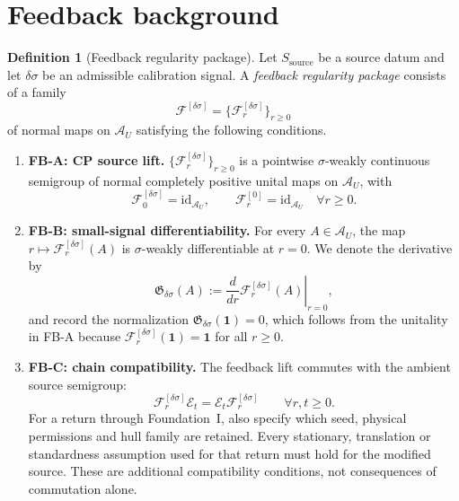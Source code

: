 \documentclass[12pt]{article}
\theoremstyle{definition}
\newtheorem{definition}[theorem]{Definition}
\theoremstyle{remark}
\begin{document}
\section{Feedback background}\label{app:feedback_background}
\begin{definition}[Feedback regularity package]\label{def:FB}
Let \(S_{\mathrm{source}}\) be a source datum and let
\(\delta\sigma\) be an admissible calibration signal. A
\emph{feedback regularity package} consists of a family
\[
\mathscr F^{[\delta\sigma]}
=
\{\mathscr F_r^{[\delta\sigma]}\}_{r\ge0}
\]
of normal maps on \(\mathcal A_U\) satisfying the following conditions.
\begin{enumerate}
\item \textbf{FB-A: CP source lift.}
  \(\{\mathscr F_r^{[\delta\sigma]}\}_{r\ge0}\) is a pointwise
  \(\sigma\)-weakly continuous semigroup of normal completely positive
  unital maps on \(\mathcal A_U\), with
  \[
  \mathscr F_0^{[\delta\sigma]}=\mathrm{id}_{\mathcal A_U},
  \qquad
  \mathscr F_r^{[0]}=\mathrm{id}_{\mathcal A_U}
  \quad
  \forall r\ge0.
  \]
\item \textbf{FB-B: small-signal differentiability.}
  For every \(A\in\mathcal A_U\), the map
  \(r\mapsto \mathscr F_r^{[\delta\sigma]}(A)\) is
  \(\sigma\)-weakly differentiable at \(r=0\). We denote the
  derivative by
  \[
  \mathfrak G_{\delta\sigma}(A)
  :=
  \left.
  \frac{d}{dr}\mathscr F_r^{[\delta\sigma]}(A)
  \right|_{r=0},
  \]
  and record the normalization
  \(\mathfrak G_{\delta\sigma}(\mathbf 1)=0\), which follows from the
  unitality in FB-A because
  \(\mathscr F_r^{[\delta\sigma]}(\mathbf 1)=\mathbf 1\) for all
  \(r\ge0\).
\item \textbf{FB-C: chain compatibility.}
  The feedback lift commutes with the ambient source semigroup:
  \[
  \mathscr F_r^{[\delta\sigma]}\mathcal E_t
  =
  \mathcal E_t\mathscr F_r^{[\delta\sigma]}
  \qquad
  \forall r,t\ge0.
  \]
  For a return through Foundation~I, also specify which seed,
  physical permissions and hull family are retained. Every stationary,
  translation or standardness assumption used for that return must
  hold for the modified source. These are additional compatibility
  conditions, not consequences of commutation alone.
\end{enumerate}
\end{definition}
\end{document}
